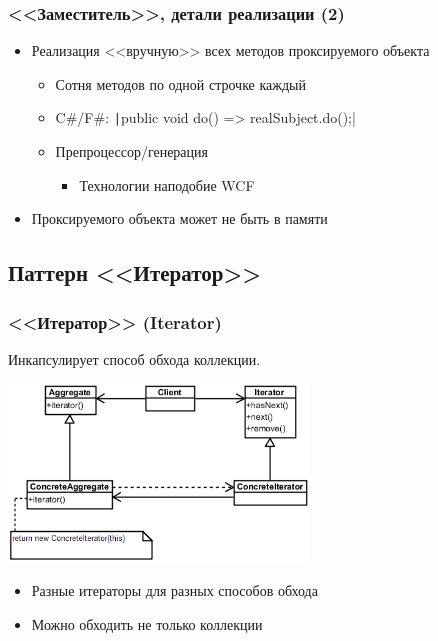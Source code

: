 \documentclass{../../slides-style}
\begin{document}
    \begin{frame}
        \frametitle{<<Заместитель>>, детали реализации (2)}
        \begin{itemize}
            \item Реализация <<вручную>> всех методов проксируемого объекта
            \begin{itemize}
                \item Сотня методов по одной строчке каждый
                \item C\#/F\#: \texttt|public void do() => realSubject.do();|
                \item Препроцессор/генерация
                \begin{itemize}
                    \item Технологии наподобие WCF
                \end{itemize}
            \end{itemize}
            \item Проксируемого объекта может не быть в памяти
        \end{itemize}
    \end{frame}

    \subsection{Паттерн <<Итератор>>}

    \begin{frame}
        \frametitle{<<Итератор>> (Iterator)}
        Инкапсулирует способ обхода коллекции.
        \begin{center}
            \includegraphics[width=0.6\textwidth]{iterator.png}
        \end{center}
        \begin{itemize}
            \item Разные итераторы для разных способов обхода
            \item Можно обходить не только коллекции
        \end{itemize}
    \end{frame}
\end{document}
